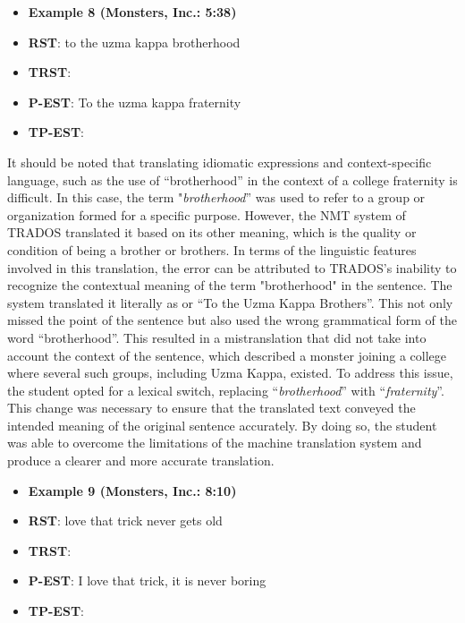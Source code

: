 \documentclass[english]{textolivre}
\begin{document}
\begin{itemize}
\item \textbf{Example 8 (Monsters, Inc.: 5:38)}
\item \textbf{RST}: to the uzma kappa brotherhood
\item \textbf{TRST}: 
\item \textbf{P-EST}: To the uzma kappa fraternity
\item \textbf{TP-EST}: 
\end{itemize}

It should be noted that translating idiomatic expressions and context-specific language, such as the use of “brotherhood” in the context of a college fraternity is difficult. In this case, the term "\emph{brotherhood}” was used to refer to a group or organization formed for a specific purpose. However, the NMT system of TRADOS translated it based on its other meaning, which is the quality or condition of being a brother or brothers. In terms of the linguistic features involved in this translation, the error can be attributed to TRADOS's inability to recognize the contextual meaning of the term "brotherhood" in the sentence. The system translated it literally as  or “To the Uzma Kappa Brothers”. This not only missed the point of the sentence but also used the wrong grammatical form of the word “brotherhood”. This resulted in a mistranslation that did not take into account the context of the sentence, which described a monster joining a college where several such groups, including Uzma Kappa, existed. To address this issue, the student opted for a lexical switch, replacing “\emph{brotherhood}” with “\emph{fraternity}”. This change was necessary to ensure that the translated text conveyed the intended meaning of the original sentence accurately. By doing so, the student was able to overcome the limitations of the machine translation system and produce a clearer and more accurate translation.

\begin{itemize}
\item \textbf{Example 9 (Monsters, Inc.: 8:10)}
\item \textbf{RST}: love that trick never gets old
\item \textbf{TRST}: 
\item \textbf{P-EST}: I love that trick, it is never boring
\item \textbf{TP-EST}: 
\end{itemize}
\end{document}
